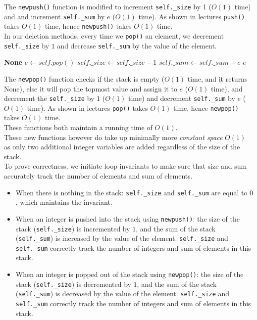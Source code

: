 \documentclass[12pt]{article}
\begin{document}
The \texttt{newpush()} function is modified to increment \texttt{self.\_size} by 1 ($O(1)$ time) and and increment \texttt{self.\_sum} by $e$ ($O(1)$ time). As shown in lectures \texttt{push()} takes $O(1)$ time, hence \texttt{newpush()} takes $O(1)$ time.\\

In our deletion methods, every time we \texttt{pop()} an element, we decrement \texttt{self.\_size} by $1$ and decrease \texttt{self.\_sum} by the value of the element. \\

\begin{algorithmic}[1]
 
     
        \State \Return \textbf{None}
    \EndIf
    \State $e \gets self.pop()$
    \State $self.\_size \gets self.\_size - 1$
    \State $self.\_sum \gets self.\_sum - e$
    \State \Return $e$
\EndFunction
\end{algorithmic}


The \texttt{newpop()} function checks if the stack is empty ($O(1)$ time, and it returns None), else it will pop the topmost value and assign it to $e$ ($O(1)$ time), and decrement the \texttt{self.\_size} by $1$ ($O(1)$ time) and decrement \texttt{self.\_sum} by $e$ ($O(1)$ time). As shown in lectures \texttt{pop()} takes $O(1)$ time, hence \texttt{newpop()} takes $O(1)$ time. \\

These functions both maintain a running time of $O(1)$.\\

These new functions however do take up minimally more \textit{constant space} $O(1)$ as only two additional integer variables are added regardless of the size of the stack.\\

To prove correctness, we initiate loop invariants to make sure that size and sum accurately track the number of elements and sum of elements. 

\begin{itemize}
    \item When there is nothing in the stack: \texttt{self.\_size} and \texttt{self.\_sum} are equal to $0$, which maintains the invariant.
    \item When an integer is pushed into the stack using \texttt{newpush()}: the size of the stack (\texttt{self.\_size}) is incremented by $1$, and the sum of the stack (\texttt{self.\_sum}) is increased by the value of the element. \texttt{self.\_size} and \texttt{self.\_sum} correctly track the number of integers and sum of elements in this stack.
    \item  When an integer is popped out of the stack using \texttt{newpop()}: the size of the stack (\texttt{self.\_size}) is decremented by $1$, and the sum of the stack (\texttt{self.\_sum}) is decreased by the value of the element. \texttt{self.\_size} and \texttt{self.\_sum} correctly track the number of integers and sum of elements in this stack.
\end{itemize}
\end{document}
